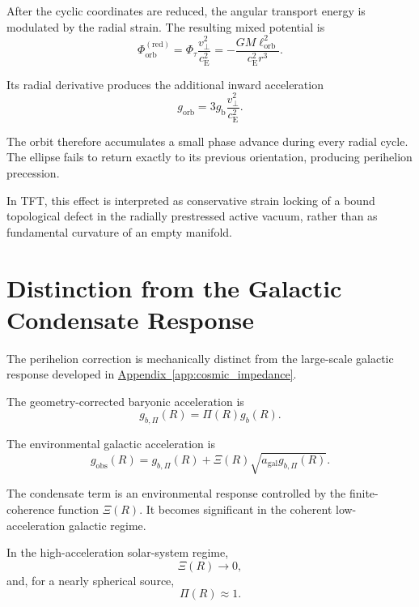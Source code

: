 After the cyclic coordinates are reduced, the angular transport energy is modulated by the radial strain. The resulting mixed potential is
\begin{equation}
    \Phi_{\mathrm{orb}}^{(\mathrm{red})} = \Phi_\tau \frac{v_\perp^2}{c_{\mathrm{E}}^2} = - \frac{ GM\ell_{\mathrm{orb}}^2 }{ c_{\mathrm{E}}^2r^3 }.
\end{equation}

Its radial derivative produces the additional inward acceleration
\begin{equation}
    g_{\mathrm{orb}} = 3g_{\mathrm{b}} \frac{v_\perp^2}{c_{\mathrm{E}}^2}.
\end{equation}

The orbit therefore accumulates a small phase advance during every radial cycle. The ellipse fails to return exactly to its previous orientation, producing perihelion precession.

In TFT, this effect is interpreted as conservative strain locking of a bound topological defect in the radially prestressed active vacuum, rather than as fundamental curvature of an empty manifold.

\section{Distinction from the Galactic Condensate Response}

The perihelion correction is mechanically distinct from the large-scale galactic response developed in \hyperref[app:cosmic_impedance]{Appendix~\ref*{app:cosmic_impedance}}.

The geometry-corrected baryonic acceleration is
\begin{equation}
    g_{b,\Pi}(R) = \Pi(R)g_b(R).
\end{equation}

The environmental galactic acceleration is
\begin{equation}
    g_{\mathrm{obs}}(R) = g_{b,\Pi}(R) + \Xi(R) \sqrt{ a_{\mathrm{gal}}g_{b,\Pi}(R) }.
\end{equation}

The condensate term is an environmental response controlled by the finite-coherence function $\Xi(R)$. It becomes significant in the coherent low-acceleration galactic regime.

In the high-acceleration solar-system regime,
\begin{equation}
    \Xi(R) \rightarrow 0,
\end{equation}
and, for a nearly spherical source,
\begin{equation}
    \Pi(R) \approx 1.
\end{equation}

